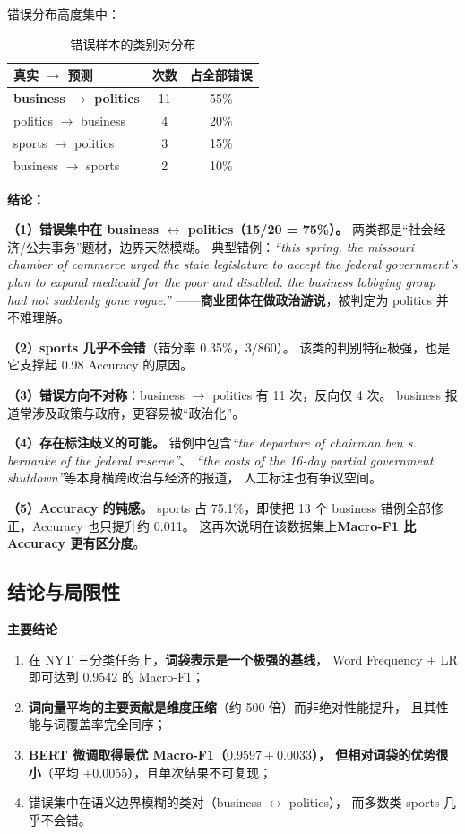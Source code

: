 \documentclass[12pt,a4paper]{ctexart}
\newcommand{\best}[1]{\textbf{#1}}
\begin{document}
错误分布高度集中：

\begin{table}[htbp]
\centering
\small
\caption{错误样本的类别对分布}
\label{tab:errdist}
\begin{tabular}{lcc}
\toprule
真实 $\to$ 预测 & 次数 & 占全部错误 \\
\midrule
\best{business $\to$ politics} & 11 & 55\% \\
politics $\to$ business & 4 & 20\% \\
sports $\to$ politics & 3 & 15\% \\
business $\to$ sports & 2 & 10\% \\
\bottomrule
\end{tabular}
\end{table}

\textbf{结论：}

\textbf{（1）错误集中在 business $\leftrightarrow$ politics（15/20 = 75\%）。}
两类都是``社会经济/公共事务''题材，边界天然模糊。
典型错例：\emph{``this spring, the missouri chamber of commerce urged the state
legislature to accept the federal government's plan to expand medicaid for the poor
and disabled. the business lobbying group had not suddenly gone rogue.''}
——\textbf{商业团体在做政治游说}，被判定为 politics 并不难理解。

\textbf{（2）sports 几乎不会错}（错分率 0.35\%，3/860）。
该类的判别特征极强，也是它支撑起 0.98 Accuracy 的原因。

\textbf{（3）错误方向不对称}：business $\to$ politics 有 11 次，反向仅 4 次。
business 报道常涉及政策与政府，更容易被``政治化''。

\textbf{（4）存在标注歧义的可能。}
错例中包含\emph{``the departure of chairman ben s. bernanke of the federal reserve''}、
\emph{``the costs of the 16-day partial government shutdown''}等本身横跨政治与经济的报道，
人工标注也有争议空间。

\textbf{（5）Accuracy 的钝感。}
sports 占 75.1\%，即使把 13 个 business 错例全部修正，Accuracy 也只提升约 0.011。
这再次说明在该数据集上\textbf{Macro-F1 比 Accuracy 更有区分度}。

\subsection{结论与局限性}

\textbf{主要结论}

\begin{enumerate}
  \item 在 NYT 三分类任务上，\textbf{词袋表示是一个极强的基线}，
        Word Frequency + LR 即可达到 0.9542 的 Macro-F1；
  \item \textbf{词向量平均的主要贡献是维度压缩}（约 500 倍）而非绝对性能提升，
        且其性能与词覆盖率完全同序；
  \item \textbf{BERT 微调取得最优 Macro-F1（$0.9597\pm0.0033$），
        但相对词袋的优势很小}（平均 +0.0055），且单次结果不可复现；
  \item 错误集中在语义边界模糊的类对（business $\leftrightarrow$ politics），
        而多数类 sports 几乎不会错。
\end{enumerate}
\end{document}
